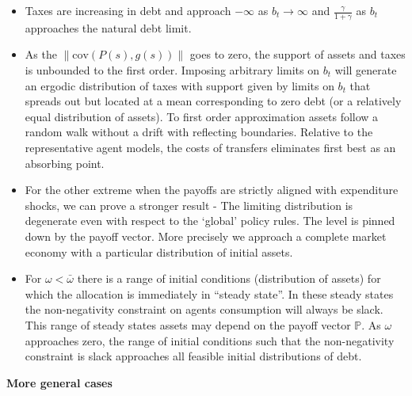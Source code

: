 \documentclass[thmsb,11pt]{article}
\newcommand{\cov}{\mathrm{cov}}
\begin{document}
\begin{itemize}
\item Taxes are increasing in debt and approach $-\infty$ as $b_t\to\infty$ and $\frac{\gamma}{1+\gamma}$ as $b_t$ approaches the natural debt limit. 

\item As the $\|\cov(P(s),g(s))\|$ goes to zero, the support of assets and taxes is unbounded to the first order. Imposing arbitrary limits on $b_t$ will generate an ergodic distribution of taxes with support given by limits on $b_t$ that spreads out but located at a mean corresponding to zero debt (or a relatively equal distribution of assets). To first order approximation assets follow a random walk without a drift with reflecting boundaries. Relative to the representative agent models, the costs of transfers eliminates first best as an absorbing point. 


\item For the other extreme when the payoffs are strictly aligned with expenditure shocks, we  can prove a stronger result - The limiting distribution is degenerate even with respect to the `global' policy rules. The level is pinned down by the payoff vector. More precisely we approach a complete market economy with a particular distribution of initial assets.


\item For $\omega<\bar{\omega}$ there is a range of initial conditions (distribution of assets) for which the  allocation is immediately in ``steady state''.  In these steady states the non-negativity constraint on agents consumption will always be slack. This range of steady states assets may depend on the payoff vector $\mathbb{P}$. As $\omega$ approaches zero, the range of initial conditions such that the non-negativity constraint is slack approaches all feasible initial distributions of debt.
\end{itemize}


\textbf{More general cases}
\end{document}
